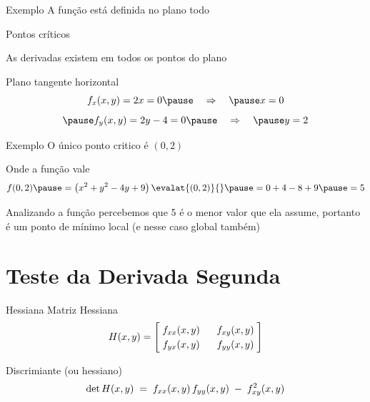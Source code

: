 \begin{frame}{Exemplo \theexemplo}
  A função está definida no plano todo

  \pause
  \vspace{\baselineskip}
  Pontos críticos

  \pause
  \vspace{\baselineskip}
  As derivadas existem em todos os pontos do plano

  \pause
  \vspace{\baselineskip}
  Plano tangente horizontal
  \[
    f_x(x, y) = 2x = 0
    \pause
    \quad\Rightarrow\quad
    \pause
    x = 0
  \]
  \[
    \pause
    f_y(x, y) = 2y -4 = 0
    \pause
    \quad\Rightarrow\quad
    \pause
    y = 2
  \]
\end{frame}

\begin{frame}{Exemplo \theexemplo}
  O único ponto critico é \((0, 2)\)

  \pause
  \vspace{\baselineskip}
  Onde a função vale
  \[
    f(0, 2)
    \pause
    = \left(x^2 + y^2 - 4y + 9\right)\evalat{(0, 2)}{}
    \pause
    = 0 + 4 - 8 + 9
    \pause
    = 5
  \]

  \pause
  \vspace{\baselineskip}
  Analizando a função percebemos que 5 é o menor valor que ela assume,
  portanto é um ponto de mínimo local (e nesse caso global também)
\end{frame}

\section{Teste da Derivada Segunda}

\begin{frame}{Hessiana}
  Matriz Hessiana
  \[
    \arraycolsep=2mm
    \def\arraystretch{1.2}
    H(x, y) = \begin{bmatrix}
      \null\;f_{xx}(x, y)\;\null & \null\;f_{xy}(x, y)\;\null \\
      f_{yx}(x, y) & f_{yy}(x, y)
    \end{bmatrix}
  \]

  \pause
  \vspace{\baselineskip}
  Discrimiante (ou hessiano)
  \[
    \arraycolsep=2mm
    \def\arraystretch{1.2}
    \det H(x, y) \;=\; f_{xx}(x, y)\,f_{yy}(x, y) \;-\; f_{xy}^2(x, y)
  \]
\end{frame}

